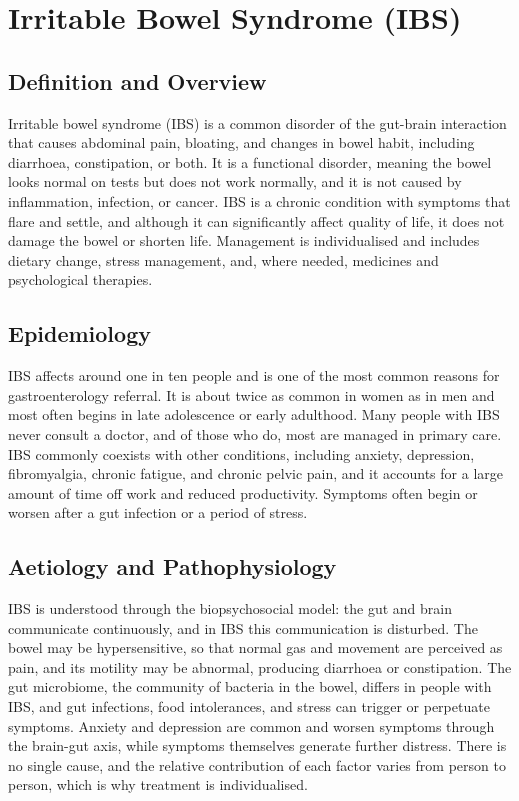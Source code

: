 \chapter{Irritable Bowel Syndrome (IBS)}

\section*{Definition and Overview}
Irritable bowel syndrome (IBS) is a common disorder of the gut-brain interaction that causes abdominal pain, bloating, and changes in bowel habit, including diarrhoea, constipation, or both. It is a functional disorder, meaning the bowel looks normal on tests but does not work normally, and it is not caused by inflammation, infection, or cancer. IBS is a chronic condition with symptoms that flare and settle, and although it can significantly affect quality of life, it does not damage the bowel or shorten life. Management is individualised and includes dietary change, stress management, and, where needed, medicines and psychological therapies.

\section*{Epidemiology}
IBS affects around one in ten people and is one of the most common reasons for gastroenterology referral. It is about twice as common in women as in men and most often begins in late adolescence or early adulthood. Many people with IBS never consult a doctor, and of those who do, most are managed in primary care. IBS commonly coexists with other conditions, including anxiety, depression, fibromyalgia, chronic fatigue, and chronic pelvic pain, and it accounts for a large amount of time off work and reduced productivity. Symptoms often begin or worsen after a gut infection or a period of stress.

\section*{Aetiology and Pathophysiology}
IBS is understood through the biopsychosocial model: the gut and brain communicate continuously, and in IBS this communication is disturbed. The bowel may be hypersensitive, so that normal gas and movement are perceived as pain, and its motility may be abnormal, producing diarrhoea or constipation. The gut microbiome, the community of bacteria in the bowel, differs in people with IBS, and gut infections, food intolerances, and stress can trigger or perpetuate symptoms. Anxiety and depression are common and worsen symptoms through the brain-gut axis, while symptoms themselves generate further distress. There is no single cause, and the relative contribution of each factor varies from person to person, which is why treatment is individualised.

